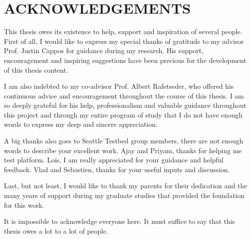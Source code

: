 \chapter*{ACKNOWLEDGEMENTS}
This thesis owes its existence to help, support and inspiration of several people. First of all, I would like to express my special thanks of gratitude to my advisor Prof. Justin Cappos for guidance during my research. His support, encouragement and inspiring suggestions have been precious for the development of this thesis content.

I am also indebted to my co-advisor Prof. Albert Rafetseder, who offered his continuous advice and encouragement throughout the course of this thesis. I am so deeply grateful for his help, professionalism and valuable guidance throughout this project and through my entire program of study that I do not have enough words to express my deep and sincere appreciation. 

A big thanks also goes to Seattle Testbed group members, there are not enough words to describe your excellent work. Ajay and Priyam, thanks for helping me test platform. Lois, I am really appreciated for your guidance and helpful feedback. Vlad and Sebastien, thanks for your useful inputs and discussion.    

Last, but not least, I would like to thank my parents for their dedication and the many years of support during my graduate studies that provided the foundation for this work.

It is impossible to acknowledge everyone here. It must suffice to say that this thesis owes a lot to a lot of people.
